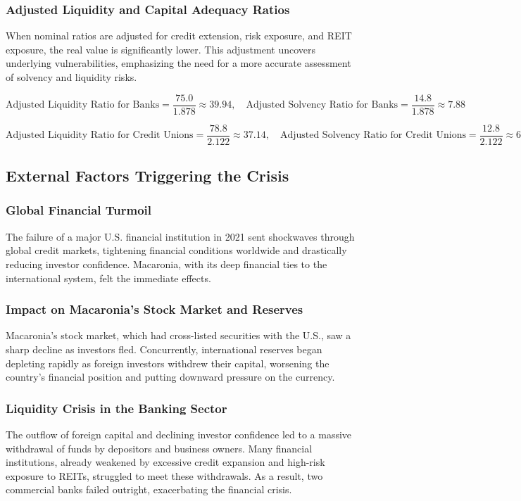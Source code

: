 \subsubsection{Adjusted Liquidity and Capital Adequacy Ratios}
When nominal ratios are adjusted for credit extension, risk exposure, and REIT exposure, the real value is significantly lower. This adjustment uncovers underlying vulnerabilities, emphasizing the need for a more accurate assessment of solvency and liquidity risks. 

\[
\text{Adjusted Liquidity Ratio for Banks} = \frac{75.0}{1.878} \approx 39.94, \quad \text{Adjusted Solvency Ratio for Banks} = \frac{14.8}{1.878} \approx 7.88
\]

\[
\text{Adjusted Liquidity Ratio for Credit Unions} = \frac{78.8}{2.122} \approx 37.14, \quad \text{Adjusted Solvency Ratio for Credit Unions} = \frac{12.8}{2.122} \approx 6.03
\]

\subsection{External Factors Triggering the Crisis}

\subsubsection{Global Financial Turmoil}
The failure of a major U.S. financial institution in 2021 sent shockwaves through global credit markets, tightening financial conditions worldwide and drastically reducing investor confidence. Macaronia, with its deep financial ties to the international system, felt the immediate effects.

\subsubsection{Impact on Macaronia’s Stock Market and Reserves}
Macaronia’s stock market, which had cross-listed securities with the U.S., saw a sharp decline as investors fled. Concurrently, international reserves began depleting rapidly as foreign investors withdrew their capital, worsening the country’s financial position and putting downward pressure on the currency.

\subsubsection{Liquidity Crisis in the Banking Sector}
The outflow of foreign capital and declining investor confidence led to a massive withdrawal of funds by depositors and business owners. Many financial institutions, already weakened by excessive credit expansion and high-risk exposure to REITs, struggled to meet these withdrawals. As a result, two commercial banks failed outright, exacerbating the financial crisis.

